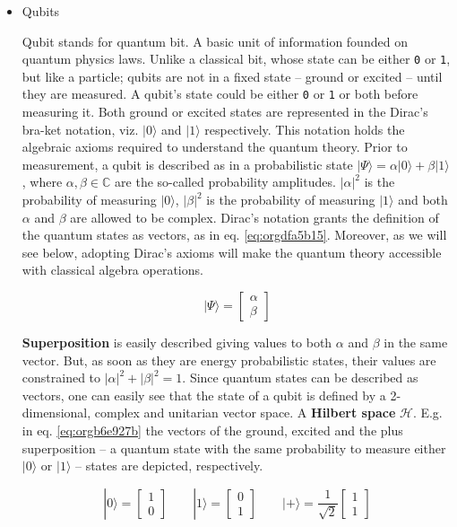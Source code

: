 \begin{itemize}
\item Qubits
\label{sec:orgdb28f26}

Qubit stands for quantum bit.
A basic unit of information founded on quantum physics laws.
Unlike a classical bit, whose state can be either \texttt{0} or \texttt{1}, but like a particle; qubits are not in a fixed state -- ground or excited -- until they are measured.
A qubit's state could be either \texttt{0} or \texttt{1} or both before measuring it.
Both ground or excited states are represented in the Dirac's bra-ket notation, viz. \(| 0 \rangle\) and \(| 1 \rangle\) respectively.
This notation holds the algebraic axioms \cite{Nielsen_2009} required to understand the quantum theory.
Prior to measurement, a qubit is described as in a probabilistic state \(| \Psi \rangle = \alpha | 0 \rangle + \beta | 1 \rangle\), where \(\alpha, \beta \in \mathbb{C}\) are the so-called probability amplitudes.
\(|\alpha|^2\) is the probability of measuring \(| 0 \rangle\), \(|\beta|^2\) is the probability of measuring \(| 1 \rangle\) and both \(\alpha\) and \(\beta\) are allowed to be complex.
Dirac's notation grants the definition of the quantum states as vectors, as in eq. \ref{eq:orgdfa5b15}.
Moreover, as we will see below, adopting Dirac's axioms will make the quantum theory accessible with classical algebra operations. 

\begin{equation}
\label{eq:orgdfa5b15}
|\Psi\rangle = \begin{bmatrix}\alpha \\ \beta \end{bmatrix}
\end{equation}

\textbf{Superposition} is easily described giving values to both \(\alpha\) and \(\beta\) in the same vector.
But, as soon as they are energy probabilistic states, their values are constrained to \(|\alpha|^2 + |\beta|^2 = 1\).
Since quantum states can be described as vectors, one can easily see that the state of a qubit is defined by a 2-dimensional, complex and unitarian vector space.
A \textbf{Hilbert space} \(\mathscr{H}\).
E.g. in eq. \ref{eq:orgb6e927b} the vectors of the ground, excited and the plus superposition -- a quantum state with the same probability to measure either \(|0\rangle\) or \(|1\rangle\) -- states are depicted, respectively.

\begin{equation}
\label{eq:orgb6e927b}
|0\rangle = \begin{bmatrix}1 \\ 0 \end{bmatrix} \quad \quad |1\rangle = \begin{bmatrix}0 \\ 1 \end{bmatrix} \quad \quad |+\rangle = \frac{1}{\sqrt{2}} \begin{bmatrix}1 \\ 1 \end{bmatrix}
\end{equation}


\end{itemize}
